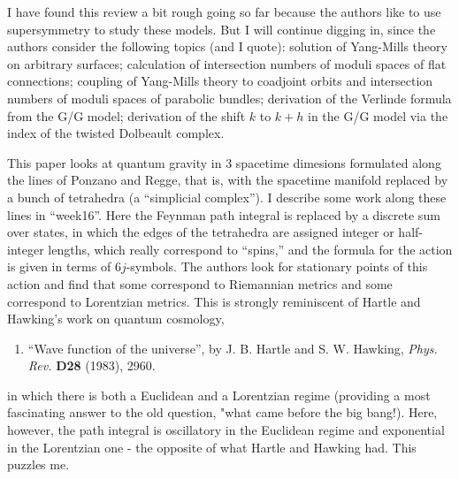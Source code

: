 \documentclass{article}
\def\tightlist{}
\renewcommand{\texttt}[1]{%
  \begingroup
  \ttfamily
  \begingroup\lccode`~=`/\lowercase{\endgroup\def~}{/\discretionary{}{}{}}%
  \begingroup\lccode`~=`[\lowercase{\endgroup\def~}{[\discretionary{}{}{}}%
  \begingroup\lccode`~=`.\lowercase{\endgroup\def~}{.\discretionary{}{}{}}%
  \catcode`/=\active\catcode`[=\active\catcode`.=\active
  \scantokens{#1\noexpand}%
  \endgroup
}
\begin{document}
I have found this review a bit rough going so far because the authors
like to use supersymmetry to study these models. But I will continue
digging in, since the authors consider the following topics (and I
quote): solution of Yang-Mills theory on arbitrary surfaces; calculation
of intersection numbers of moduli spaces of flat connections; coupling
of Yang-Mills theory to coadjoint orbits and intersection numbers of
moduli spaces of parabolic bundles; derivation of the Verlinde formula
from the G/G model; derivation of the shift \(k\) to \(k+h\) in the G/G
model via the index of the twisted Dolbeault complex.


This paper looks at quantum gravity in 3 spacetime dimesions formulated
along the lines of Ponzano and Regge, that is, with the spacetime
manifold replaced by a bunch of tetrahedra (a ``simplicial complex''). I
describe some work along these lines in ``week16''. Here the Feynman
path integral is replaced by a discrete sum over states, in which the
edges of the tetrahedra are assigned integer or half-integer lengths,
which really correspond to ``spins,'' and the formula for the action is
given in terms of \(6j\)-symbols. The authors look for stationary points
of this action and find that some correspond to Riemannian metrics and
some correspond to Lorentzian metrics. This is strongly reminiscent of
Hartle and Hawking's work on quantum cosmology,

\begin{enumerate}
\def\labelenumi{\arabic{enumi})}
\setcounter{enumi}{3}
\tightlist
\item
  ``Wave function of the universe'', by J. B. Hartle and S. W. Hawking,
  \emph{Phys. Rev.} \textbf{D28} (1983), 2960.
\end{enumerate}

in which there is both a Euclidean and a Lorentzian regime (providing a
most fascinating answer to the old question, "what came before the big
bang!). Here, however, the path integral is oscillatory in the Euclidean
regime and exponential in the Lorentzian one - the opposite of what
Hartle and Hawking had. This puzzles me.
\end{document}
